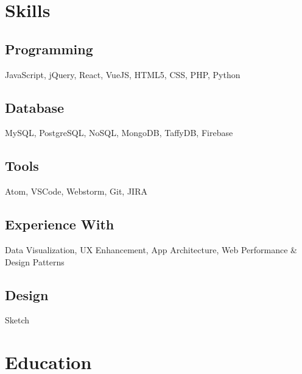 \documentclass[]{gagan-resume}
\begin{document}
\lastupdated






\begin{minipage}[t]{0.33\textwidth} 




\section{Skills}
\subsection{Programming}
JavaScript, jQuery, React, VueJS, HTML5, CSS, PHP, Python
\subsection{Database}
MySQL, PostgreSQL, NoSQL, MongoDB, TaffyDB, Firebase
\subsection{Tools}
Atom, VSCode, Webstorm, Git, JIRA
\subsection{Experience With}
Data Visualization, UX Enhancement, App Architecture, Web Performance \& Design Patterns
\subsection{Design}
Sketch
\sectionsep




\section{Education} 


\end{minipage}
\end{document}
